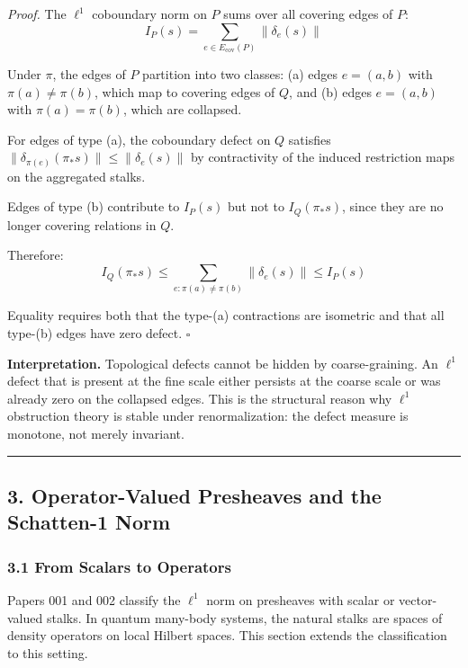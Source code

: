 \documentclass[
]{article}
\begin{document}
\emph{Proof.} The \(\ell^1\) coboundary norm on \(P\) sums over all
covering edges of \(P\):
\[I_P(s) = \sum_{e \in E_{\mathrm{cov}}(P)} \|\delta_e(s)\|\]

Under \(\pi\), the edges of \(P\) partition into two classes: (a) edges
\(e = (a, b)\) with \(\pi(a) \neq \pi(b)\), which map to covering edges
of \(Q\), and (b) edges \(e = (a, b)\) with \(\pi(a) = \pi(b)\), which
are collapsed.

For edges of type (a), the coboundary defect on \(Q\) satisfies
\(\|\delta_{\pi(e)}(\pi_* s)\| \leq \|\delta_e(s)\|\) by contractivity
of the induced restriction maps on the aggregated stalks.

Edges of type (b) contribute to \(I_P(s)\) but not to \(I_Q(\pi_* s)\),
since they are no longer covering relations in \(Q\).

Therefore:
\[I_Q(\pi_* s) \leq \sum_{e: \pi(a) \neq \pi(b)} \|\delta_e(s)\| \leq I_P(s)\]

Equality requires both that the type-(a) contractions are isometric and
that all type-(b) edges have zero defect. \(\square\)

\textbf{Interpretation.} Topological defects cannot be hidden by
coarse-graining. An \(\ell^1\) defect that is present at the fine scale
either persists at the coarse scale or was already zero on the collapsed
edges. This is the structural reason why \(\ell^1\) obstruction theory
is stable under renormalization: the defect measure is monotone, not
merely invariant.

\begin{center}\rule{0.5\linewidth}{0.5pt}\end{center}

\subsection{3. Operator-Valued Presheaves and the Schatten-1
Norm}\label{operator-valued-presheaves-and-the-schatten-1-norm}

\subsubsection{3.1 From Scalars to
Operators}\label{from-scalars-to-operators}

Papers 001 and 002 classify the \(\ell^1\) norm on presheaves with
scalar or vector-valued stalks. In quantum many-body systems, the
natural stalks are spaces of density operators on local Hilbert spaces.
This section extends the classification to this setting.
\end{document}
